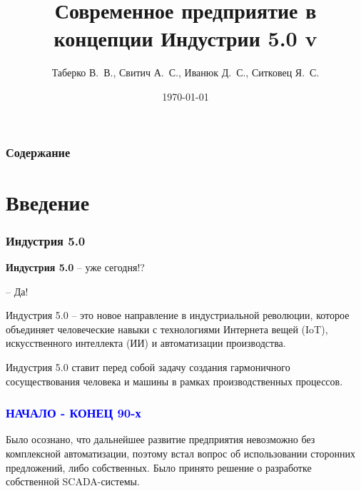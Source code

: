 \documentclass{beamer}
\title{
    Современное предприятие в концепции Индустрии 5.0
    \ifdefined\tagversion
        \newline
        \newline
        v\tagversion
    \fi}
\author{Таберко В.~В., Свитич А.~С., Иванюк Д.~С., Ситковец Я.~С.}
\institute{Савушкин продукт}
\date{\today}
\begin{document}
\frame{\titlepage}

\begin{frame}
    \frametitle{Содержание}
    \tableofcontents
\end{frame}

\section{Введение}
 {
  \begin{frame}
      \frametitle{Индустрия 5.0}

      {\Large \textbf{Индустрия 5.0}} -- уже сегодня!?

      -- Да!
  \end{frame}
 }
 \begin{frame}
    Индустрия 5.0 -- это новое направление в индустриальной революции, которое объединяет человеческие навыки с технологиями Интернета вещей (IoT), искусственного интеллекта (ИИ) и автоматизации производства.
 \end{frame}

 \begin{frame}
    Индустрия 5.0 ставит перед собой задачу создания гармоничного сосуществования человека и машины в рамках производственных процессов.
 \end{frame}

 \begin{frame}
    \frametitle{\textcolor{blue}{НАЧАЛО - КОНЕЦ 90-х}}

      Было осознано, что дальнейшее развитие предприятия невозможно без комплексной автоматизации, поэтому встал вопрос об использовании сторонних предложений, либо собственных. Было принято решение о разработке собственной SCADA-системы.

 \end{frame}
\end{document}

